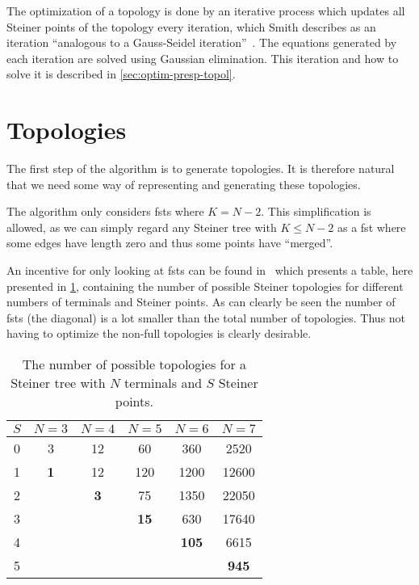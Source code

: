 The optimization of a topology is done by an iterative process which updates all
Steiner points of the topology every iteration, which Smith describes as an
iteration ``analogous to a Gauss-Seidel iteration''~\cite[p.~145]{Smith1992}.
The equations generated by each iteration are solved using Gaussian
elimination.  This iteration and how to solve it is described in
\cref{sec:optim-presp-topol}.

\section{Topologies}
\label{sec:topologies}

The first step of the algorithm is to generate topologies.  It is therefore
natural that we need some way of representing and generating these topologies.

The algorithm only considers \glspl{fst} where $K = N - 2$.  This simplification
is allowed, as we can simply regard any Steiner tree with $K \le N - 2$ as a
\gls{fst} where some edges have length zero and thus some points have
``merged''.

An incentive for only looking at \glspl{fst} can be found in~\cite{Gilbert1968}
which presents a table, here presented in \cref{tab:number-of-topologies},
containing the number of possible Steiner topologies for different numbers of
terminals and Steiner points.  As can clearly be seen the number of \glspl{fst}
(the diagonal) is a lot smaller than the total number of topologies.  Thus not
having to optimize the non-full topologies is clearly desirable.

\begin{table}[htbp]
  \centering
  \begin{tabular}{cccccc}
    \toprule
    $S$ & $N = 3$    & $N = 4$    & $N = 5$     & $N = 6$      & $N = 7$      \\
    \midrule
    0   & 3          & 12         & 60          & 360          & 2520         \\
    1   & \textbf{1} & 12         & 120         & 1200         & 12600        \\
    2   &            & \textbf{3} & 75          & 1350         & 22050        \\
    3   &            &            & \textbf{15} & 630          & 17640        \\
    4   &            &            &             & \textbf{105} & 6615         \\
    5   &            &            &             &              & \textbf{945} \\
    \bottomrule
  \end{tabular}
  \caption{The number of possible topologies for a Steiner tree with $N$
    terminals and $S$ Steiner points.\label{tab:number-of-topologies}}
\end{table}

